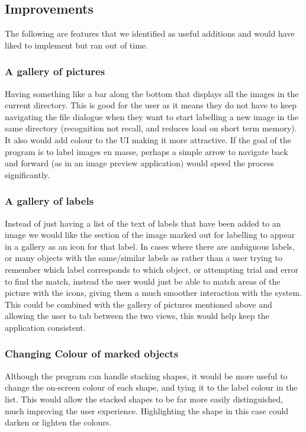 \documentclass[a4paper,11pt,oneside]{article}
\begin{document}
\subsection{Improvements}
The following are features that we identified as useful additions and would have
liked to implement but ran out of time.

\subsubsection{A gallery of pictures} 
Having something like a bar along the bottom that displays all the images in the
current directory.  This is good for the user as it means they do not have to
keep navigating the file dialogue when they want to start labelling a new image
in the same directory (recognition not recall, and reduces load on short term
memory).  It also would add colour to the UI making it more attractive. If the
goal of the program is to label images en masse, perhaps a simple arrow to
navigate back and forward (as in an image preview application) would speed the
process significantly.

\subsubsection{A gallery of labels}
Instead of just having a list of the text of labels that have been added to an
image we would like the section of the image marked out for labelling to appear
in a gallery as an icon for that label.  In cases where there are ambiguous
labels, or many objects with the same/similar labels as rather than a user
trying to remember which label corresponds to which object, or attempting trial
and error to find the match, instead the user would just be able to match areas
of the picture with the icons, giving them a much smoother interaction with the
system.  This could be combined with the gallery of pictures mentioned above and
allowing the user to tab between the two views, this would help keep the
application consistent.

\subsubsection{Changing Colour of marked objects}
Although the program can handle stacking shapes, it would be more useful to
change the on-screen colour of each shape, and tying it to the label colour in
the list.  This would allow the stacked shapes to be far more easily distinguished,
much improving the user experience. Highlighting the shape in this case could
darken or lighten the colours.
\end{document}
